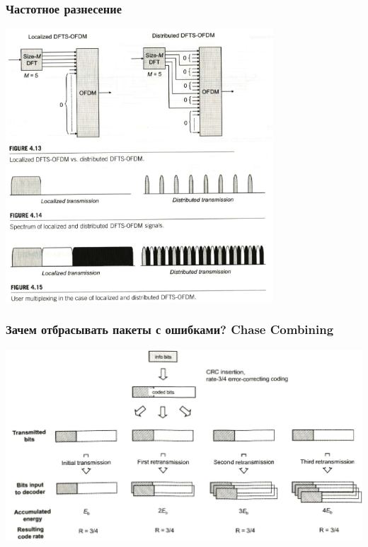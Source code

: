 \documentclass[utf8]{beamer}
\begin{document}
\begin{frame}
\frametitle{Частотное разнесение}
\begin{center}
\includegraphics[width=0.75\textwidth]{pic/sc-fdma-distributed.png}
\end{center}
\end{frame}
\begin{frame}
\frametitle{Зачем отбрасывать пакеты с ошибками? Chase Combining}
\begin{center}
\includegraphics[width=\textwidth]{pic/chase-combining.png}
\end{center}
\end{frame}
\end{document}

